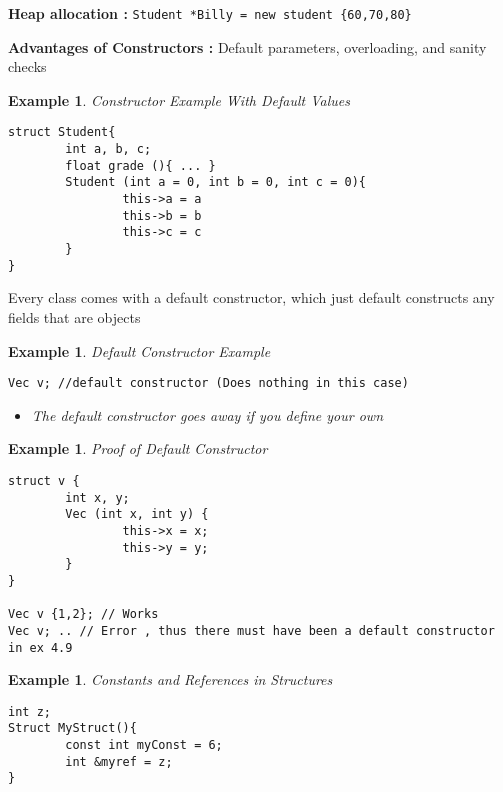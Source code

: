 \documentclass{article}
\newtheorem{ex}[theorem]{Example}
\newenvironment{ablock}[1]{%
    \tcolorbox[beamer,%
    noparskip,breakable,
    colback=lightcoral,colframe=darkred,%
    colbacklower=tomato!75!lightcoral,%
    title=#1]}%
    {\endtcolorbox}
\begin{document}
\textbf{Heap allocation :} \verb|Student *Billy = new student {60,70,80}|

\textbf{Advantages of Constructors :} Default parameters, overloading, and sanity checks

\begin{ex} Constructor Example With Default Values
\begin{lstlisting}
struct Student{
		int a, b, c;
		float grade (){ ... }
		Student (int a = 0, int b = 0, int c = 0){
				this->a = a
				this->b = b
				this->c = c
		}
}

\end{lstlisting}
\end{ex}

\begin{ablock}{Note}
Every class comes with a default constructor, which just default constructs any fields that are objects
\end{ablock}

\begin{ex} Default Constructor Example
\begin{lstlisting}
Vec v; //default constructor (Does nothing in this case)
\end{lstlisting}
\begin{itemize}
\item The default constructor goes away if you define your own
\end{itemize}
\end{ex}

\begin{ex} Proof of Default Constructor 
\begin{lstlisting}
struct v {
		int x, y;
		Vec (int x, int y) { 
				this->x = x;
				this->y = y;
		}
}

Vec v {1,2}; // Works
Vec v; .. // Error , thus there must have been a default constructor in ex 4.9
\end{lstlisting}
\end{ex}

\begin{ex} Constants and References in Structures
\begin{lstlisting}
int z;
Struct MyStruct(){
		const int myConst = 6;
		int &myref = z;
}
\end{lstlisting}
\end{ex}
\end{document}
